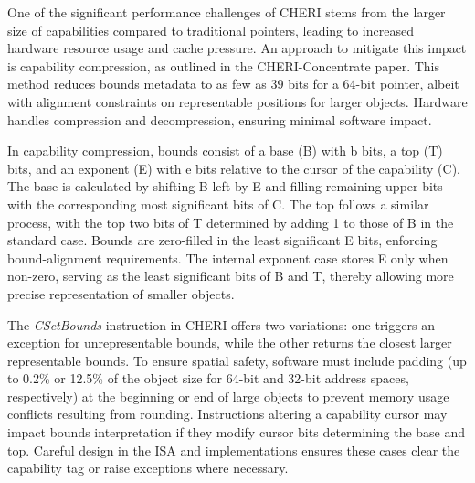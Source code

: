One of the significant performance challenges of CHERI stems from the larger size of capabilities compared to traditional pointers, leading to 
increased hardware resource usage and cache pressure. 
An approach to mitigate this impact is capability compression, as outlined in the CHERI-Concentrate paper\cite{woodruff_cheri_2019}. This method reduces bounds metadata 
to as few as 39 bits for a 64-bit pointer, albeit with alignment constraints on representable positions for larger objects. Hardware handles 
compression and decompression, ensuring minimal software impact.
\newline

In capability compression, bounds consist of a base (B) with b bits, a top (T) bits, and 
an exponent (E) with e bits relative to the cursor of the capability (C). The base is calculated by shifting B 
left by E and filling remaining upper bits with the corresponding most significant bits of C. The top follows a 
similar process, with the top two bits of T determined by adding 1 to those of B in the standard case. Bounds 
are zero-filled in the least significant E bits, enforcing bound-alignment requirements. The internal exponent case stores E only 
when non-zero, serving as the least significant bits of B and T, thereby allowing more precise representation of smaller objects.
\newline

The \textit{CSetBounds} instruction in CHERI offers two variations: one triggers an exception for unrepresentable bounds, while the other returns 
the closest larger representable bounds. To ensure spatial safety, software must include padding (up to 0.2\% or 12.5\% of the object size 
for 64-bit and 32-bit address spaces, respectively) at the beginning or end of large objects to prevent memory usage conflicts resulting 
from rounding. Instructions altering a capability cursor may impact bounds interpretation if they modify cursor bits determining the 
base and top. Careful design in the ISA and implementations ensures these cases clear the capability tag or raise exceptions where necessary.














